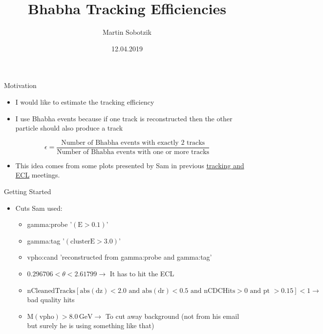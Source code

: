 \documentclass[10pt]{beamer}
\title{Bhabha Tracking Efficiencies}
\date{12.04.2019}
\author{Martin Sobotzik}
\institute{Johannes Gutenberg Universit\"at Mainz}
\begin{document}
\maketitle
{%



\begin{frame}{Motivation}

\begin{itemize}	
	\item I would like to estimate the tracking efficiency 
	\item I use Bhabha events because if one track is reconstructed then the other particle should also produce a track

\end{itemize}
	\begin{equation*}
		\epsilon = \frac{\textrm{Number of Bhabha events with exactly 2 tracks}}{\textrm{Number of Bhabha events with one or more tracks}}
	\end{equation*}
	
	\begin{itemize}
		\item  This idea comes from some plots presented by Sam in previous  \href{https://confluence.desy.de/display/BI/ECL+Meetings?preview=/84320165/109161400/SCunliffe181123-ECL.pdf}{tracking and ECL} meetings.
	\end{itemize}





\end{frame}
	
\begin{frame}{Getting Started}
	
\begin{itemize} 
	\item Cuts Sam used:
	
	
	\begin{itemize}
		\item gamma:probe '$(\textrm{E} > 0.1 )$'
		\item gamma:tag '$(\textrm{clusterE} > 3.0)$'
		\item vpho:cand 'reconstructed from gamma:probe and gamma:tag'
	\end{itemize}

	
		\begin{itemize}
			\item $0.296706 < \theta < 2.61799 \rightarrow$ It has to hit the ECL
			\item $\textrm{nCleanedTracks}[ \textrm{abs}(\textrm{dz}) < 2.0 \textrm{ and } \textrm{abs}(\textrm{dr}) < 0.5 \textrm{ and nCDCHits} > 0 \textrm{ and pt } > 0.15] < 1 \rightarrow $ bad quality hits 
			\item $\textrm{M}(\textrm{vpho}) > 8.0\,\textrm{GeV} \rightarrow $ To cut away background (not from his email but surely he is using something like that)					
		\end{itemize}
	

\end{itemize}
\end{frame}}
\end{document}
